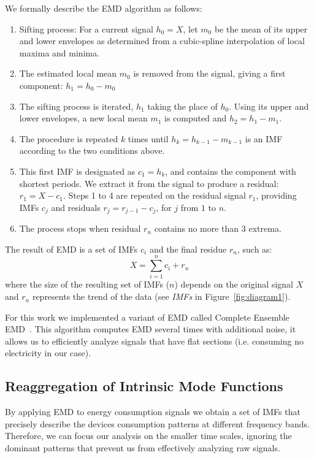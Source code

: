 We formally describe the EMD algorithm as follows: 
\begin{enumerate}
\item Sifting process: For a current signal $h_0=X$, let $m_0$ be the mean of its upper and lower envelopes as determined from a cubic-spline interpolation of local maxima and minima.
\item The estimated local mean $m_0$ is removed from the signal, giving a first component: $h_1 = h_0-m_0$
\item The sifting process is iterated, $h_1$ taking the place of $h_0$. Using its upper and lower envelopes, a new local mean $m_1$ is computed and $h_2 = h_1-m_1$.
\item The procedure is repeated $k$ times until $h_k=h_{k-1}-m_{k-1}$ is an IMF according to the two conditions above.
\item This first IMF is designated as $c_1 = h_k$, and contains the component with shortest periods. We extract it from the signal to produce a residual: $r_1 = X - c_1$.  Steps 1 to 4 are repeated on the residual signal $r_1$, providing IMFs $c_j$ and residuals $r_j  = r_{j-1}-c_j$, for $j$ from $1$ to $n$.
\item The process stops when residual $r_n$ contains no more than 3 extrema.
\end{enumerate}

The result of EMD is a set of IMFs $c_i$ and the final residue $r_n$, such as: \[X=\sum^{n}_{i=1}c_i+r_n\]
where the size of the resulting set of IMFs ($n$) depends on the original signal $X$ and $r_n$ represents the trend of 
the data (see \emph{IMFs} in Figure~\ref{fig:diagram1}).

For this work we implemented a variant of EMD called Complete Ensemble EMD~\cite{torres:icassp2012}.
This algorithm computes EMD several times with additional noise, it allows us to efficiently analyze signals that have 
flat sections (i.e. consuming no electricity in our case). %

\subsection{Reaggregation of Intrinsic Mode Functions} \label{methodo:corr}
By applying EMD to energy consumption signals we obtain a set of IMFs that precisely describe the devices consumption 
patterns at different frequency bands.  Therefore, we can focus our analysis on the smaller time scales, ignoring the dominant 
patterns that prevent us from effectively analyzing raw signals.

